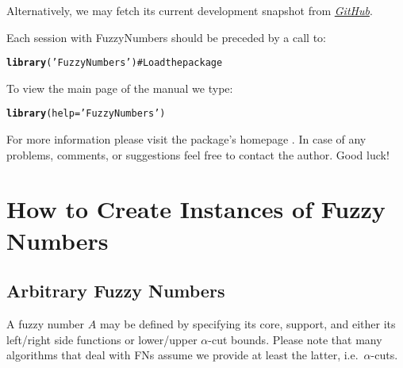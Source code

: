 \documentclass[11pt]{article}\usepackage{graphicx, color}
\makeatletter
\newcommand{\hlfunctioncall}[1]{\textcolor[rgb]{0.501960784313725,0,0.329411764705882}{\textbf{#1}}}%
\newcommand{\hlstring}[1]{\textcolor[rgb]{0.6,0.6,1}{#1}}%
\newcommand{\hlcomment}[1]{\textcolor[rgb]{0.180392156862745,0.6,0.341176470588235}{#1}}%
\newenvironment{kframe}{%
 \def\at@end@of@kframe{}%
 \ifinner\ifhmode%
  \def\at@end@of@kframe{\end{minipage}}%
  \begin{minipage}{\columnwidth}%
 \fi\fi%
 \def\FrameCommand##1{\hskip\@totalleftmargin \hskip-\fboxsep
 \colorbox{shadecolor}{##1}\hskip-\fboxsep
     \hskip-\linewidth \hskip-\@totalleftmargin \hskip\columnwidth}%
 \MakeFramed {\advance\hsize-\width
   \@totalleftmargin\z@ \linewidth\hsize
   \@setminipage}}%
 {\par\unskip\endMakeFramed%
 \at@end@of@kframe}
\newenvironment{knitrout}{}{} %
\newcommand{\package}[1]{\textsf{#1}\xspace}
\makeatother
\begin{document}
\noindent
Alternatively, we may fetch its current development snapshot
from \href{https://github.com/Rexamine/FuzzyNumbers}{\textit{GitHub}}.


\bigskip
Each session with \package{FuzzyNumbers} should be preceded by
a call to:

\begin{knitrout}\small
{}\color{fgcolor}\begin{kframe}
\begin{alltt}
\hlfunctioncall{library}(\hlstring{'FuzzyNumbers'}) \hlcomment{# Load the package}
\end{alltt}
\end{kframe}
\end{knitrout}


\bigskip
To view the main page of the manual we type:

\begin{knitrout}\small
{}\color{fgcolor}\begin{kframe}
\begin{alltt}
\hlfunctioncall{library}(help=\hlstring{'FuzzyNumbers'})
\end{alltt}
\end{kframe}
\end{knitrout}


\noindent
For more information please visit the package's homepage \cite{FuzzyNumbersHome}.
In case of any problems, comments, or suggestions feel free to contact the author.
Good luck!








\section{How to Create Instances of Fuzzy Numbers}


\subsection{Arbitrary Fuzzy Numbers}

A fuzzy number $A$ may be defined by specifying
its core, support, and either its left/right side functions
or lower/upper $\alpha$-cut bounds. Please note that many algorithms that
deal with FNs assume we provide at least the latter, i.e.~$\alpha$-cuts.
\end{document}
